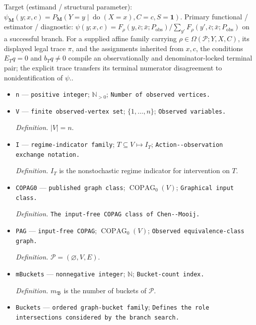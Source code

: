 \documentclass{article}
\begin{document}
Target (estimand / structural parameter): \(\psi_{\mathbf M}(y;x,c)=P_{\mathbf M}(Y=y\mid\operatorname{do}(X=x),C=c,S=\mathbf 1)\).
Primary functional / estimator / diagnostic: \(\psi(y;x,c)=F_{\rho}(y,\bar c;\bar x;P_{\mathrm{obs}})\big/\sum_{y'}F_{\rho}(y',\bar c;\bar x;P_{\mathrm{obs}})\) on a successful branch. For a supplied affine family carrying \(\rho\in\Omega(\mathcal P;Y,X,C)\), its displayed legal trace \(\pi\), and the assignments inherited from \(x,c\), the conditions \(E_Tq=0\) and \(b_Tq\neq0\) compile an observationally and denominator-locked terminal pair; the explicit trace transfers its terminal numerator disagreement to nonidentification of \(\psi\)..
\begin{itemize}
  \item \texttt{n} --- \texttt{positive integer}; \(\mathbb N_{>0}\); \texttt{Number of observed vertices.}
  \item \texttt{V} --- \texttt{finite observed-\allowbreak{}vertex set}; \(\{1,\ldots,n\}\); \texttt{Observed variables.}
  \par\smallskip\noindent\emph{Definition.} \(|V|=n\).
  \item \texttt{I} --- \texttt{regime-\allowbreak{}indicator family}; \(T\subseteq V\mapsto I_T\); \texttt{Action-\allowbreak{}-\allowbreak{}observation exchange notation.}
  \par\smallskip\noindent\emph{Definition.} \(I_T\) is the nonstochastic regime indicator for intervention on \(T\).
  \item \texttt{COPAG0} --- \texttt{published graph class}; \(\operatorname{COPAG}_0(V)\); \texttt{Graphical input class.}
  \par\smallskip\noindent\emph{Definition.} \texttt{The input-\allowbreak{}free COPAG class of Chen-\allowbreak{}-\allowbreak{}Mooij.}
  \item \texttt{PAG} --- \texttt{input-\allowbreak{}free COPAG}; \(\operatorname{COPAG}_0(V)\); \texttt{Observed equivalence-\allowbreak{}class graph.}
  \par\smallskip\noindent\emph{Definition.} \(\mathcal P=(\varnothing,V,E)\).
  \item \texttt{mBuckets} --- \texttt{nonnegative integer}; \(\mathbb N\); \texttt{Bucket-\allowbreak{}count index.}
  \par\smallskip\noindent\emph{Definition.} \(m_{\mathfrak B}\) is the number of buckets of \(\mathcal P\).
  \item \texttt{Buckets} --- \texttt{ordered graph-\allowbreak{}bucket family}; \texttt{Defines the role intersections considered by the branch search.}

\end{itemize}
\end{document}
